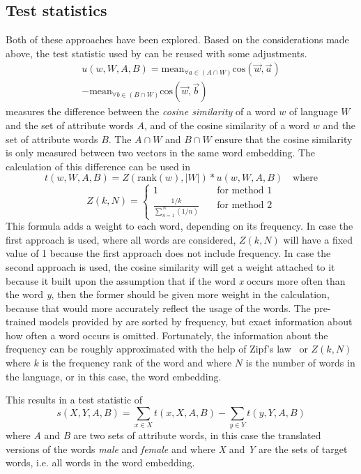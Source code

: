 \subsection{Test statistics}
Both of these approaches have been explored. Based on the considerations made above, the
test statistic used by
\textcite{caliskan_2017_semantics_language_corpora} can be reused with some adjustments. 
$$
\begin{aligned}
u(w,W,A,B) = \text{mean}_{\forall a \in (A \cap W)}\text{cos}(\overrightarrow{w}, \overrightarrow{a}) \\
- \text{mean}_{\forall b \in (B \cap W)}\text{cos}(\overrightarrow{w}, \overrightarrow{b})
\end{aligned}
$$
measures the difference between the \textit{cosine similarity} of a word $w$ of language $W$ and the set of attribute words $A$, and of the cosine similarity of a word $w$ and the
set of attribute words $B$. The $A \cap W$ and $B \cap W$ ensure that the cosine
similarity is only measured between two vectors in the same word embedding. The
calculation of this difference can be used in
$$
t(w,W,A,B) = Z(\text{rank}(w), |W|) * u(w,W,A,B)\quad\text{where}
$$
$$
Z(k,N) =
\begin{cases}
    1 & \quad \text{for method 1} \\
    \frac{1/k}{\displaystyle\sum_{n=1}^{N}(1/n)} & \quad \text{for method 2}
\end{cases}
$$
This formula adds a weight to each word, depending on its frequency.
In case the first approach is used, where all words are considered, $Z(k,N)$ will have a
fixed value of 1 because the first approach does not include frequency.
In case the second approach is used, the cosine similarity will get a weight attached
to it because it built upon the assumption that
if the word \textit{x} occurs more often than the word \textit{y}, then the former should
be given more weight in the calculation, because that would more accurately reflect the
usage of the words. The pre-trained models provided by \textcite{grave2018learning} 
are sorted by frequency, but exact information about how often a
word occurs is omitted.
Fortunately, the information about the frequency can be roughly approximated with the
help of Zipf's law~\parencite{Zipf-1935, word_embedding_zipf_context} or $Z(k,N)$ where
$k$ is the frequency rank of the word and where $N$ is the number of words in the language,
or in this case, the word embedding.

This results in a test statistic of
$$
s(X,Y,A,B) = \displaystyle\sum_{x \in X}t(x,X,A,B) - \displaystyle\sum_{y \in Y}t(y,Y,A,B)
$$
where \textit{A} and \textit{B} are two sets of attribute words, in this case the
translated versions of the words \textit{male} and
\textit{female} and where \textit{X} and \textit{Y} are the sets of target words, i.e.
all words in the word embedding.


